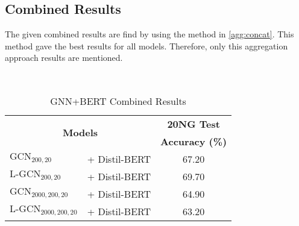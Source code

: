 \subsection[Combined Results]{Combined \DOCEM{} Results}
The given combined results are find by using the method in \cref{agg:concat}. This method gave the best results for all models. Therefore, only this aggregation approach results are mentioned.
\begin{table}[ht]
    \centering{}
    \caption{GNN+BERT Combined Results}~\label{tab:results:combined}
    \begin{tabular}{llc}\toprule
        \multicolumn{2}{c}{\multirow{2}{*}{\textbf{Models}}} & \textbf{20NG Test}                          \\
                                                             &                    & \textbf{Accuracy (\%)} \\ \midrule
        \(\text{GCN}_{200,20}\)                              & + Distil-BERT      & 67.20                  \\
        \(\text{L-GCN}_{200,20}\)                            & + Distil-BERT      & 69.70                  \\
        \(\text{GCN}_{2000,200,20}\)                         & + Distil-BERT      & 64.90                  \\
        \(\text{L-GCN}_{2000,200,20}\)                       & + Distil-BERT      & 63.20                  \\
        \bottomrule
    \end{tabular}
\end{table}

